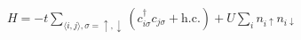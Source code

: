 \documentclass[border=0.1mm]{standalone}
\newcommand{\D}{^{\dag}}
\newcommand{\hc}{\mathrm{h.c.}}
\begin{document}
$H = - t \sum\limits_{\langle i,j\rangle, \sigma=\uparrow, \downarrow} (c\D_{i \sigma} c_{j \sigma} + \hc) + U \sum\limits_i n_{i\uparrow} n_{i\downarrow}$
\end{document}

